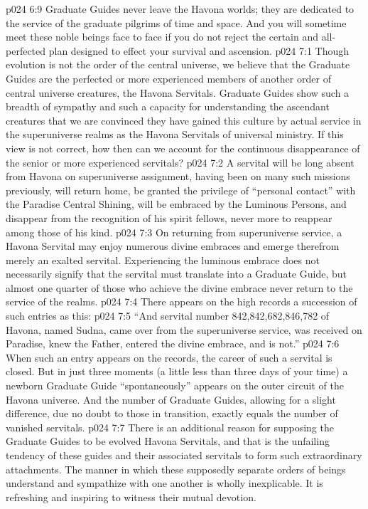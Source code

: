 \vs p024 6:9 \pc Graduate Guides never leave the Havona worlds; they are dedicated to the service of the graduate pilgrims of time and space. And you will sometime meet these noble beings face to face if you do not reject the certain and all\hyp{}perfected plan designed to effect your survival and ascension.
\vs p024 7:1 Though evolution is not the order of the central universe, we believe that the Graduate Guides are the perfected or more experienced members of another order of central universe creatures, the Havona Servitals. Graduate Guides show such a breadth of sympathy and such a capacity for understanding the ascendant creatures that we are convinced they have gained this culture by actual service in the superuniverse realms as the Havona Servitals of universal ministry. If this view is not correct, how then can we account for the continuous disappearance of the senior or more experienced servitals?
\vs p024 7:2 A servital will be long absent from Havona on superuniverse assignment, having been on many such missions previously, will return home, be granted the privilege of “personal contact” with the Paradise Central Shining, will be embraced by the Luminous Persons, and disappear from the recognition of his spirit fellows, never more to reappear among those of his kind.
\vs p024 7:3 On returning from superuniverse service, a Havona Servital may enjoy numerous divine embraces and emerge therefrom merely an exalted servital. Experiencing the luminous embrace does not necessarily signify that the servital must translate into a Graduate Guide, but almost one quarter of those who achieve the divine embrace never return to the service of the realms.
\vs p024 7:4 \pc There appears on the high records a succession of such entries as this:
\vs p024 7:5 “And servital number 842,842,682,846,782 of Havona, named Sudna, came over from the superuniverse service, was received on Paradise, knew the Father, entered the divine embrace, and is not.”
\vs p024 7:6 When such an entry appears on the records, the career of such a servital is closed. But in just three moments (a little less than three days of your time) a newborn Graduate Guide “spontaneously” appears on the outer circuit of the Havona universe. And the number of Graduate Guides, allowing for a slight difference, due no doubt to those in transition, exactly equals the number of vanished servitals.
\vs p024 7:7 \pc There is an additional reason for supposing the Graduate Guides to be evolved Havona Servitals, and that is the unfailing tendency of these guides and their associated servitals to form such extraordinary attachments. The manner in which these supposedly separate orders of beings understand and sympathize with one another is wholly inexplicable. It is refreshing and inspiring to witness their mutual devotion.
